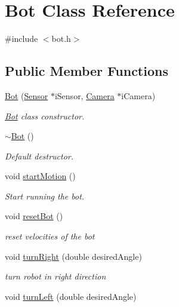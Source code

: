 \hypertarget{class_bot}{}\section{Bot Class Reference}
\label{class_bot}


{\ttfamily \#include $<$bot.\+h$>$}

\subsection*{Public Member Functions}
\begin{DoxyCompactItemize}
\item 
\mbox{\hyperlink{class_bot_a14b4bfcbda8c051d8447e73073567b50}{Bot}} (\mbox{\hyperlink{class_sensor}{Sensor}} $\ast$i\+Sensor, \mbox{\hyperlink{class_camera}{Camera}} $\ast$i\+Camera)
\begin{DoxyCompactList}\small\item\em \mbox{\hyperlink{class_bot}{Bot}} class constructor. \end{DoxyCompactList}\item 
\mbox{\hyperlink{class_bot_a4163b0f6c91f94cbeb3145eeda8cd361}{$\sim$\+Bot}} ()
\begin{DoxyCompactList}\small\item\em Default destructor. \end{DoxyCompactList}\item 
void \mbox{\hyperlink{class_bot_a5c1f98ef7f22894832865c5987d184c3}{start\+Motion}} ()
\begin{DoxyCompactList}\small\item\em Start running the bot. \end{DoxyCompactList}\item 
void \mbox{\hyperlink{class_bot_aeae87db5fd2d6a130587f665e39a6557}{reset\+Bot}} ()
\begin{DoxyCompactList}\small\item\em reset velocities of the bot \end{DoxyCompactList}\item 
void \mbox{\hyperlink{class_bot_a07fd8d141a617b711eee7ab3c9e99171}{turn\+Right}} (double desired\+Angle)
\begin{DoxyCompactList}\small\item\em turn robot in right direction \end{DoxyCompactList}\item 
void \mbox{\hyperlink{class_bot_a6f9bf5628c1faedb8da493b381ba95ac}{turn\+Left}} (double desired\+Angle)

\end{DoxyCompactItemize}
